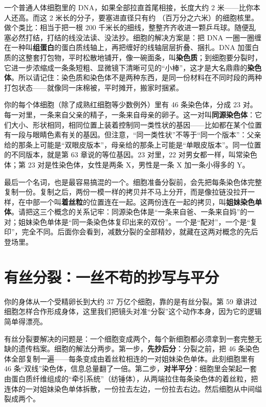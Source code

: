 一个普通人体细胞里的 DNA，如果全部拉直首尾相接，长度大约 2 米——比你本人还高。而这 2 米长的分子，要塞进直径只有约 （百万分之六米）的细胞核里。做个类比：相当于把一根 200 千米长的细线，整整齐齐收进一颗乒乓球。随便乱塞必然打结，打结的线没法读、没法抄。细胞的解决方案是：把 DNA 一圈一圈缠在一种叫\textbf{组蛋白}的蛋白质线轴上，再把缠好的线轴层层折叠、捆扎。DNA 加蛋白质的这整套打包物，平时松散地铺开，像一碗面条，叫\textbf{染色质}；到细胞要分裂时，它进一步浓缩成一条条短粗、显微镜下清晰可见的“小棒”，这才是大名鼎鼎的\textbf{染色体}。所以请记住：染色质和染色体不是两种东西，是同一份材料在不同时段的两种打包状态——就像同一床棉被，平时摊开，搬家时捆紧。

你的每个体细胞（除了成熟红细胞等少数例外）里有 46 条染色体，分成 23 对。每一对里，一条来自父亲的精子，一条来自母亲的卵子。这一对叫\textbf{同源染色体}：它们大小、形状相同，相同位置上装着控制同一类性状的基因——比如都在某个位置有一段与眼睛色素有关的基因。但注意，“同一类性状”不等于“同一个版本”：父亲给的那条上可能是“双眼皮版本”，母亲给的那条上可能是“单眼皮版本”。同一位置的不同版本，就是第 63 章说的等位基因。23 对里，22 对男女都一样，叫常染色体；第 23 对是性染色体，女性是两条 X，男性是一条 X 加一条小得多的 Y。

最后一个名词，也是最容易搞混的一个。细胞准备分裂前，会先把每条染色体完整复制一份。复制之后，两份一模一样的拷贝并不马上分开，而是像拉链没拉开一样，在中部一个叫\textbf{着丝粒}的位置连在一起。这两份连在一起的拷贝，叫\textbf{姐妹染色单体}。请把这三个概念的关系记牢：同源染色体是“一条来自爸、一条来自妈”的一对；姐妹染色单体是“同一条染色体复印出来的双份”。一个是“配对”，一个是“复印”，完全不同。后面你会看到，减数分裂的全部精妙，就藏在这两对概念的先后登场里。

\section{有丝分裂：一丝不苟的抄写与平分}

你的身体从一个受精卵长到大约 37 万亿个细胞，靠的是有丝分裂。第 59 章讲过细胞怎样合作形成身体，这里我们把镜头对准“分裂”这个动作本身，因为它的逻辑简单得漂亮。

有丝分裂要解决的问题是：一个细胞变成两个，每个新细胞都必须拿到一套完整无缺的遗传档案。细胞的解法分两步。第一步，\textbf{先抄后分}：分裂之前，把 46 条染色体全部复制一遍——每条变成由着丝粒相连的一对姐妹染色单体。此刻细胞里有 46 条“双线”染色体，信息总量翻了一倍。第二步，\textbf{对半平分}：细胞里会架起一套由蛋白质纤维组成的“牵引系统”（纺锤体），从两端拉住每条染色体的着丝粒，把连体的一对姐妹染色单体拆散，一份拉去左边，一份拉去右边。然后细胞从中间缢裂成两个。

